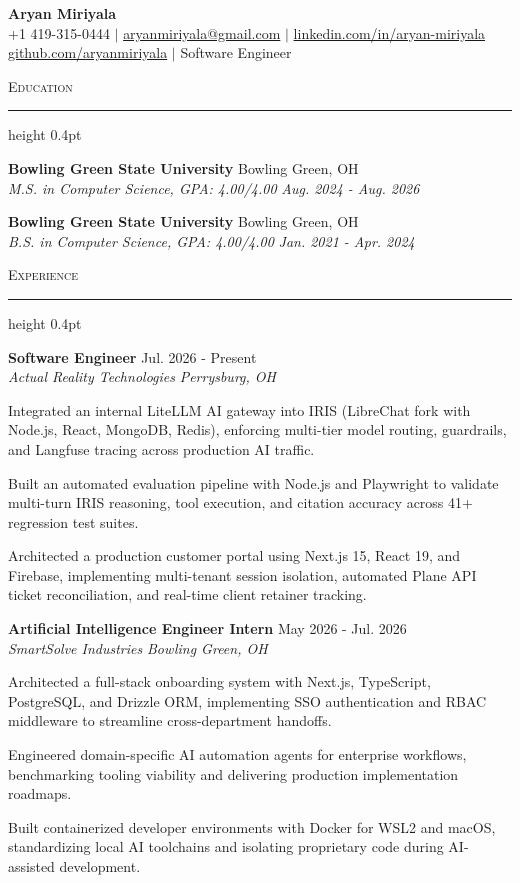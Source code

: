 \documentclass[letterpaper,11pt]{article}
\newcommand{\resumesection}[1]{%
  \par\vspace{2pt}%
  {\large\scshape #1}\par\vspace{2pt}%
  \hrule height 0.4pt\vspace{2pt}%
}
\newcommand{\resumeSubheading}[4]{
  \textbf{#1} \hfill #2\\
  \textit{#3} \hfill \textit{#4}
}
\begin{document}
\begin{center}
  {\LARGE \textbf{Aryan Miriyala}}\\[2pt]
  \small
  +1 419-315-0444 $|$ \href{mailto:aryanmiriyala@gmail.com}{aryanmiriyala@gmail.com} $|$ \href{https://www.linkedin.com/in/aryan-miriyala-7788a21b6/}{linkedin.com/in/aryan-miriyala}\\
  \href{https://github.com/aryanmiriyala}{github.com/aryanmiriyala} $|$ Software Engineer
\end{center}\vspace{-6pt}

\resumesection{Education}
\resumeSubheading
{Bowling Green State University}{Bowling Green, OH}
{M.S. in Computer Science, GPA: 4.00/4.00}{Aug. 2024 - Aug. 2026}

\resumeSubheading
{Bowling Green State University}{Bowling Green, OH}
{B.S. in Computer Science, GPA: 4.00/4.00}{Jan. 2021 - Apr. 2024}

\resumesection{Experience}
\resumeSubheading
{Software Engineer}{Jul. 2026 - Present}
{Actual Reality Technologies}{Perrysburg, OH}
\begin{tightitemize}
  \item Integrated an internal LiteLLM AI gateway into IRIS (LibreChat fork with Node.js, React, MongoDB, Redis), enforcing multi-tier model routing, guardrails, and Langfuse tracing across production AI traffic.
  \item Built an automated evaluation pipeline with Node.js and Playwright to validate multi-turn IRIS reasoning, tool execution, and citation accuracy across 41+ regression test suites.
  \item Architected a production customer portal using Next.js 15, React 19, and Firebase, implementing multi-tenant session isolation, automated Plane API ticket reconciliation, and real-time client retainer tracking.
\end{tightitemize}

\resumeSubheading
{Artificial Intelligence Engineer Intern}{May 2026 - Jul. 2026}
{SmartSolve Industries}{Bowling Green, OH}
\begin{tightitemize}
  \item Architected a full-stack onboarding system with Next.js, TypeScript, PostgreSQL, and Drizzle ORM, implementing SSO authentication and RBAC middleware to streamline cross-department handoffs.
  \item Engineered domain-specific AI automation agents for enterprise workflows, benchmarking tooling viability and delivering production implementation roadmaps.
  \item Built containerized developer environments with Docker for WSL2 and macOS, standardizing local AI toolchains and isolating proprietary code during AI-assisted development.
\end{tightitemize}
\end{document}
